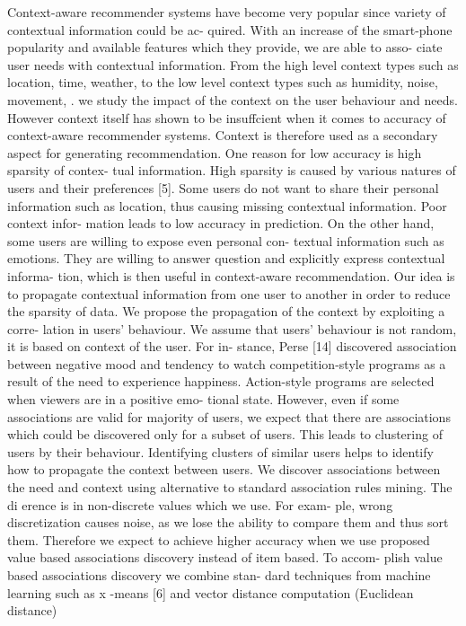 \documentclass[10pt]{extarticle}
\begin{document}
\begin{multicols}{2}
Context-aware  recommender  systems  have  become  very
popular since variety of contextual information could be ac-
quired.  With an increase of the smart-phone popularity and
available features which they provide, we are able to asso-
ciate user needs with contextual information.  From the high
level context types such as location,  time,  weather,  to the
low level context types such as humidity, noise, movement,
.
we study the impact of the context on the user behaviour and
needs.  However context itself has shown to be insuffcient
when  it  comes  to  accuracy  of  context-aware  recommender
systems.  Context is therefore used as a secondary aspect for
generating recommendation.
One  reason  for  low  accuracy  is  high  sparsity  of  contex-
tual information.  High sparsity is caused by various natures
of users and their preferences [5].  Some users do not want
to  share  their  personal  information  such  as  location,  thus
causing missing contextual information.  Poor context infor-
mation  leads  to  low  accuracy  in  prediction.   On  the  other
hand,  some users are willing to expose even personal con-
textual information such as emotions.  They are willing to
answer question and explicitly express contextual informa-
tion, which is then useful in context-aware recommendation.
Our idea is to propagate contextual information from one
user to another in order to reduce the sparsity of data.  We
propose the propagation of the context by exploiting a corre-
lation in users' behaviour.  We assume that users' behaviour
is not random,  it is based on context of the user.  For in-
stance,  Perse  [14]  discovered  association  between  negative
mood and tendency to watch competition-style programs as
a result of the need to experience happiness.   Action-style
programs are selected when viewers are in a positive emo-
tional  state.   However,  even  if  some  associations  are  valid
for majority of users, we expect that there are associations
which could be discovered only for a subset of users.  This
leads to clustering of users by their behaviour.  Identifying
clusters of similar users helps to identify how to propagate
the context between users.
We  discover  associations  between  the  need  and  context
using alternative to standard association rules mining.  The
di erence is in non-discrete values which we use.  For exam-
ple, wrong discretization causes noise, as we lose the ability
to compare them and thus sort them. Therefore we expect to
achieve higher accuracy when we use proposed value based
associations  discovery  instead  of  item  based.   To  accom-
plish  value  based  associations  discovery  we  combine  stan-
dard techniques from machine learning such as
x
-means [6]
and vector distance computation (Euclidean distance)


\end{multicols}
\end{document}
